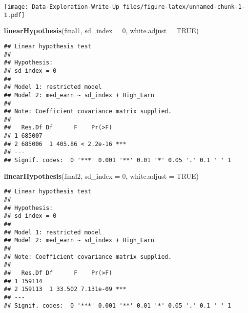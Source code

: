 \documentclass[
]{article}
\newenvironment{Shaded}{\begin{snugshade}}{\end{snugshade}}
\newcommand{\DataTypeTok}[1]{\textcolor[rgb]{0.13,0.29,0.53}{#1}}
\newcommand{\KeywordTok}[1]{\textcolor[rgb]{0.13,0.29,0.53}{\textbf{#1}}}
\newcommand{\NormalTok}[1]{#1}
\newcommand{\OtherTok}[1]{\textcolor[rgb]{0.56,0.35,0.01}{#1}}
\newcommand{\StringTok}[1]{\textcolor[rgb]{0.31,0.60,0.02}{#1}}
\begin{document}
\texttt{[image: Data-Exploration-Write-Up\_files/figure-latex/unnamed-chunk-1-1.pdf]}

\begin{Shaded}
\begin{Highlighting}[]
\KeywordTok{linearHypothesis}\NormalTok{(final1, }\StringTok{\textquotesingle{}sd\_index = 0\textquotesingle{}}\NormalTok{, }\DataTypeTok{white.adjust =} \OtherTok{TRUE}\NormalTok{)}
\end{Highlighting}
\end{Shaded}

\begin{verbatim}
## Linear hypothesis test
## 
## Hypothesis:
## sd_index = 0
## 
## Model 1: restricted model
## Model 2: med_earn ~ sd_index + High_Earn
## 
## Note: Coefficient covariance matrix supplied.
## 
##   Res.Df Df      F    Pr(>F)    
## 1 685007                        
## 2 685006  1 405.86 < 2.2e-16 ***
## ---
## Signif. codes:  0 '***' 0.001 '**' 0.01 '*' 0.05 '.' 0.1 ' ' 1
\end{verbatim}

\begin{Shaded}
\begin{Highlighting}[]
\KeywordTok{linearHypothesis}\NormalTok{(final2, }\StringTok{\textquotesingle{}sd\_index = 0\textquotesingle{}}\NormalTok{, }\DataTypeTok{white.adjust =} \OtherTok{TRUE}\NormalTok{)}
\end{Highlighting}
\end{Shaded}

\begin{verbatim}
## Linear hypothesis test
## 
## Hypothesis:
## sd_index = 0
## 
## Model 1: restricted model
## Model 2: med_earn ~ sd_index + High_Earn
## 
## Note: Coefficient covariance matrix supplied.
## 
##   Res.Df Df      F    Pr(>F)    
## 1 159114                        
## 2 159113  1 33.502 7.131e-09 ***
## ---
## Signif. codes:  0 '***' 0.001 '**' 0.01 '*' 0.05 '.' 0.1 ' ' 1
\end{verbatim}
\end{document}
